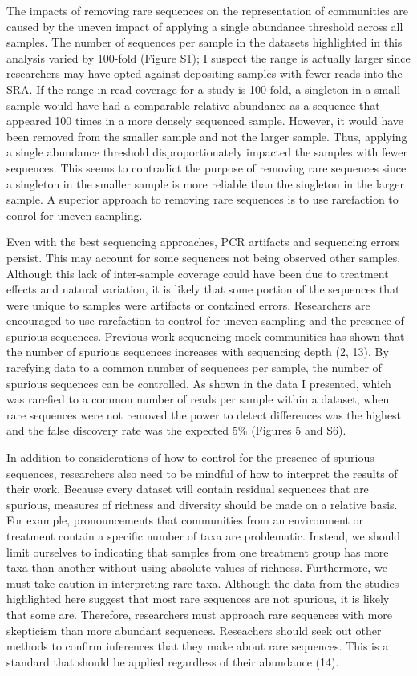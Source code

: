 \documentclass[
]{article}
\begin{document}
The impacts of removing rare sequences on the representation of
communities are caused by the uneven impact of applying a single
abundance threshold across all samples. The number of sequences per
sample in the datasets highlighted in this analysis varied by 100-fold
(Figure S1); I suspect the range is actually larger since researchers
may have opted against depositing samples with fewer reads into the SRA.
If the range in read coverage for a study is 100-fold, a singleton in a
small sample would have had a comparable relative abundance as a
sequence that appeared 100 times in a more densely sequenced sample.
However, it would have been removed from the smaller sample and not the
larger sample. Thus, applying a single abundance threshold
disproportionately impacted the samples with fewer sequences. This seems
to contradict the purpose of removing rare sequences since a singleton
in the smaller sample is more reliable than the singleton in the larger
sample. A superior approach to removing rare sequences is to use
rarefaction to conrol for uneven sampling.

Even with the best sequencing approaches, PCR artifacts and sequencing
errors persist. This may account for some sequences not being observed
other samples. Although this lack of inter-sample coverage could have
been due to treatment effects and natural variation, it is likely that
some portion of the sequences that were unique to samples were artifacts
or contained errors. Researchers are encouraged to use rarefaction to
control for uneven sampling and the presence of spurious sequences.
Previous work sequencing mock communities has shown that the number of
spurious sequences increases with sequencing depth (2, 13). By rarefying
data to a common number of sequences per sample, the number of spurious
sequences can be controlled. As shown in the data I presented, which was
rarefied to a common number of reads per sample within a dataset, when
rare sequences were not removed the power to detect differences was the
highest and the false discovery rate was the expected 5\% (Figures 5 and
S6).

In addition to considerations of how to control for the presence of
spurious sequences, researchers also need to be mindful of how to
interpret the results of their work. Because every dataset will contain
residual sequences that are spurious, measures of richness and diversity
should be made on a relative basis. For example, pronouncements that
communities from an environment or treatment contain a specific number
of taxa are problematic. Instead, we should limit ourselves to
indicating that samples from one treatment group has more taxa than
another without using absolute values of richness. Furthermore, we must
take caution in interpreting rare taxa. Although the data from the
studies highlighted here suggest that most rare sequences are not
spurious, it is likely that some are. Therefore, researchers must
approach rare sequences with more skepticism than more abundant
sequences. Reseachers should seek out other methods to confirm
inferences that they make about rare sequences. This is a standard that
should be applied regardless of their abundance (14).
\end{document}
